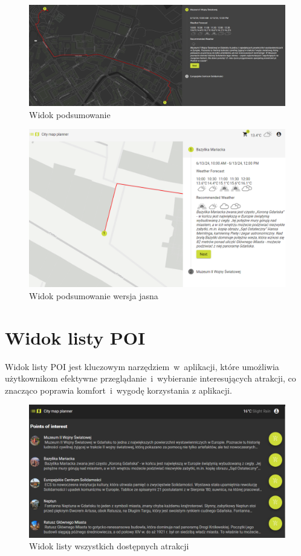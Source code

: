 \begin{figure}[H]
    \centering
    \includegraphics[width=1\textwidth]{attachments/podsumowanie}
    \caption{Widok podsumowanie}
    \label{fig:podsumowanie}
\end{figure}
\begin{figure}[H]
    \centering
    \includegraphics[width=1\textwidth]{attachments/podsumowanie-light}
    \caption{Widok podsumowanie wersja jasna}
    \label{fig:podsumowanie-light}
\end{figure}

\section{Widok listy POI}
\label{sec:poilist}

Widok listy POI jest kluczowym narzędziem~w~aplikacji, które umożliwia użytkownikom 
efektywne przeglądanie~i~wybieranie interesujących atrakcji, co znacząco poprawia komfort~i~wygodę korzystania z aplikacji.
\begin{figure}[H]
    \centering
    \includegraphics[width=1\textwidth]{attachments/poilist}
    \caption{Widok listy wszystkich dostępnych atrakcji}
    \label{fig:poilist}
\end{figure}

